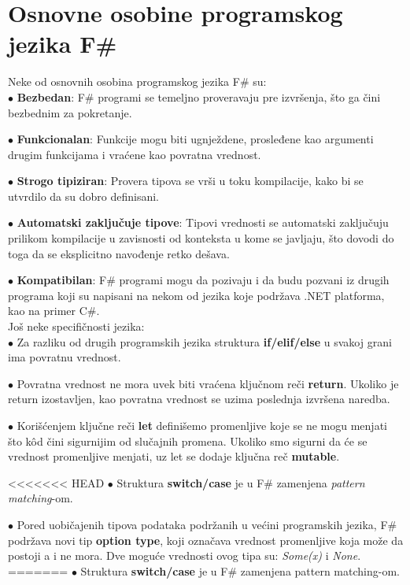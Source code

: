 \documentclass[a4paper]{article}
\begin{document}
\section{Osnovne osobine programskog jezika F\#}

Neke od osnovnih osobina programskog jezika F\# su:\\

	$\bullet$ \textbf{Bezbedan}: F\# programi se temeljno proveravaju pre izvršenja, što ga čini bezbednim za pokretanje.

	$\bullet$ \textbf{Funkcionalan}: Funkcije mogu biti ugnježdene, prosleđene kao argumenti drugim funkcijama i vraćene kao povratna vrednost.

	$\bullet$ \textbf{Strogo tipiziran}: Provera tipova se vrši u toku kompilacije, kako bi se utvrdilo da su dobro definisani. 

	$\bullet$ \textbf{Automatski zaključuje tipove}: Tipovi vrednosti se automatski zaključuju prilikom kompilacije u zavisnosti od konteksta u kome se javljaju, što dovodi do toga da se eksplicitno navođenje retko dešava.

	$\bullet$ \textbf{Kompatibilan}: F\# programi mogu da pozivaju i da budu pozvani iz drugih programa koji su napisani na nekom od jezika koje podržava .NET platforma, kao na primer C\#\cite{microsoft_c}. 
\\
 
	Još neke specifičnosti jezika: \\
	
	$\bullet$ Za razliku od drugih programskih jezika struktura \textbf{if/elif/else} u svakoj grani ima povratnu vrednost.
	 
	$\bullet$ Povratna vrednost ne mora uvek biti vraćena ključnom reči \textbf{return}. Ukoliko je return izostavljen, kao povratna vrednost se uzima poslednja izvršena naredba.
	 
	$\bullet$ Korišćenjem ključne reči \textbf{let} definišemo promenljive koje se ne mogu menjati što kôd čini sigurnijim od slučajnih promena. Ukoliko smo sigurni da će se vrednost promenljive menjati, uz let se dodaje ključna reč \textbf{mutable}.
	 
<<<<<<< HEAD
	$\bullet$ Struktura \textbf{switch/case} je u F\# zamenjena {\em pattern matching}-om\cite{expertFS}.
	 
$\bullet$ Pored uobičajenih tipova podataka podržanih u većini programskih jezika, F\# podržava novi tip \textbf{option type}, koji označava vrednost promenljive koja može da postoji a i ne mora. Dve moguće vrednosti ovog tipa su: {\em Some(x)} i {\em None}.
=======
	$\bullet$ Struktura \textbf{switch/case} je u F\# zamenjena pattern matching-om\cite{expertFS}.
	 
\end{document}
